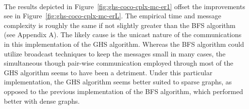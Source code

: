\documentclass[11pt,epsf]{article}
\begin{document}
{{    \paragraph{}{
      The results depicted in Figure~\ref{fig:ghs-coco-cplx-mc-er1} offset the improvements see in Figure~\ref{fig:ghs-coco-cplx-mc-erL}.
      The empirical time and message complexity is roughly the same if not slightly greater than the BFS algorithm (see Appendix A).
      The likely cause is the unicast nature of the communications in this implementation of the GHS algorithm. Whereas the BFS
      algorithm could utilize broadcast techniques to keep the messages small in many cases, the simultaneous though pair-wise
      communication employed through most of the GHS algorithm seems to have been a detriment. Under this particular implementation,
      the GHS algorithm seems better suited to sparse graphs, as opposed to the previous implementation of the BFS algorithm, which
      performed better with dense graphs\autocite[11,19]{bfs-coco}.
    }
}}
\end{document}
